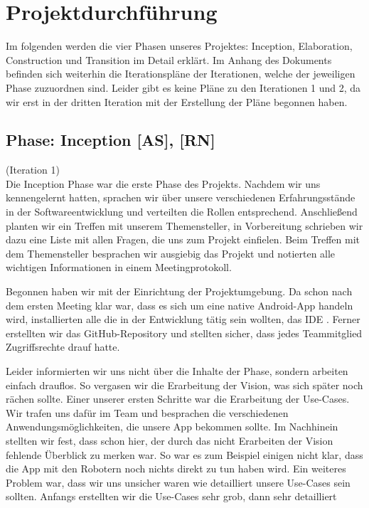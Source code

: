 \documentclass[10pt]{article}
\begin{document}
\newpage
\section{Projektdurchführung}
Im folgenden werden die vier Phasen unseres Projektes: Inception, Elaboration, Construction und Transition im Detail erklärt. Im Anhang des Dokuments befinden sich
weiterhin die Iterationspläne der Iterationen, welche der jeweiligen Phase zuzuordnen sind. Leider gibt es keine Pläne zu den Iterationen 1 und 2, da wir erst in der dritten
Iteration mit der Erstellung der Pläne begonnen haben.
\subsection{Phase: Inception [AS], [RN]}
(Iteration 1) \\
Die Inception Phase war die erste Phase des Projekts. Nachdem wir uns kennengelernt hatten, sprachen wir über
unsere verschiedenen Erfahrungsstände in der Softwareentwicklung und verteilten die Rollen entsprechend.
Anschließend planten wir ein Treffen
mit unserem Themensteller, in Vorbereitung schrieben wir dazu eine Liste mit allen Fragen, die uns zum Projekt einfielen.
Beim Treffen mit dem Themensteller besprachen wir ausgiebig das Projekt und notierten alle wichtigen Informationen
in einem Meetingprotokoll.\par
\medskip
Begonnen haben wir mit der Einrichtung der Projektumgebung. Da schon nach dem ersten Meeting klar war, dass es sich
um eine native Android-App handeln wird, installierten alle die in der Entwicklung tätig sein wollten, das IDE
. Ferner erstellten wir das GitHub-Repository und stellten sicher, dass jedes Teammitglied
Zugriffsrechte drauf hatte.\par
\medskip
Leider informierten wir uns nicht über die Inhalte der Phase, sondern arbeiten einfach drauflos.
So vergasen wir die Erarbeitung der Vision, was sich später noch rächen sollte.
Einer unserer ersten Schritte war die Erarbeitung der Use-Cases.
Wir trafen uns dafür im Team und besprachen die verschiedenen Anwendungsmöglichkeiten,
die unsere App bekommen sollte. Im Nachhinein stellten wir fest, dass schon hier, der durch das nicht
Erarbeiten der Vision fehlende Überblick zu merken war. So war es zum Beispiel einigen nicht klar, dass die
App mit den Robotern noch nichts direkt zu tun haben wird. Ein weiteres Problem war, dass wir uns unsicher waren
wie detailliert unsere Use-Cases sein sollten. Anfangs erstellten wir die Use-Cases sehr grob, dann sehr detailliert
\end{document}
